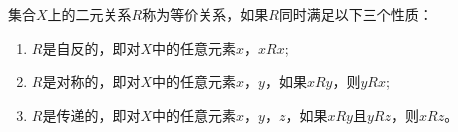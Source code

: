 \documentclass{beamer}
\begin{document}
\begin{CJK*}{UTF8}{gbsn}



\begin{frame}
  
    集合$X$上的二元关系$R$称为\alert{等价关系}，如果$R$同时满足以下三个性质：
    \begin{enumerate}[(1)]
    \item $R$是自反的，即对$X$中的任意元素$x$，$xRx$;
    \item $R$是对称的，即对$X$中的任意元素$x$，$y$，如果$xRy$，则$yRx$;
    \item $R$是传递的，即对$X$中的任意元素$x$，$y$，$z$，如果$xRy$且$yRz$，则$xRz$。
    \end{enumerate}
\end{frame}


\end{CJK*}
\end{document}

